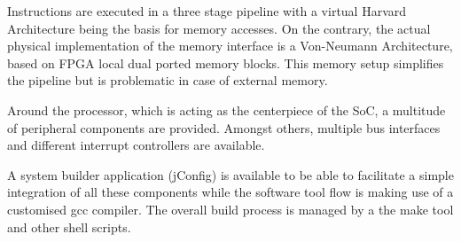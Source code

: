 		Instructions are executed in a three stage pipeline with a virtual Harvard Architecture being the basis for memory accesses. On the contrary, the actual physical implementation of the memory interface is a Von-Neumann Architecture, based on FPGA local dual ported memory blocks. This memory setup simplifies the pipeline but is problematic in case of external memory.

		Around the processor, which is acting as the centerpiece of the SoC, a multitude of peripheral components are provided. Amongst others, multiple bus interfaces and different interrupt controllers are available.

		A system builder application (jConfig) is available to be able to facilitate a simple integration of all these components while the software tool flow is making use of a customised gcc compiler. The overall build process is managed by a the make tool and other shell scripts.

